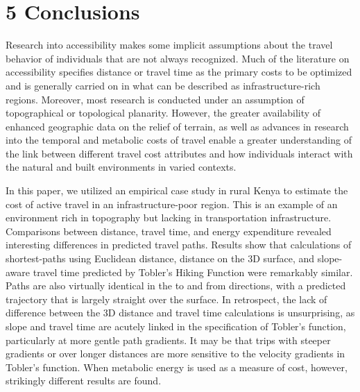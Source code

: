 \documentclass[]{elsarticle} %
\begin{document}
\hypertarget{conclusions}{%
\section{5 Conclusions}\label{conclusions}}

Research into accessibility makes some implicit assumptions about the
travel behavior of individuals that are not always recognized. Much of
the literature on accessibility specifies distance or travel time as the
primary costs to be optimized and is generally carried on in what can be
described as infrastructure-rich regions. Moreover, most research is
conducted under an assumption of topographical or topological planarity.
However, the greater availability of enhanced geographic data on the
relief of terrain, as well as advances in research into the temporal and
metabolic costs of travel enable a greater understanding of the link
between different travel cost attributes and how individuals interact
with the natural and built environments in varied contexts.

In this paper, we utilized an empirical case study in rural Kenya to
estimate the cost of active travel in an infrastructure-poor region.
This is an example of an environment rich in topography but lacking in
transportation infrastructure. Comparisons between distance, travel
time, and energy expenditure revealed interesting differences in
predicted travel paths. Results show that calculations of shortest-paths
using Euclidean distance, distance on the 3D surface, and slope-aware
travel time predicted by Tobler's Hiking Function were remarkably
similar. Paths are also virtually identical in the to and from
directions, with a predicted trajectory that is largely straight over
the surface. In retrospect, the lack of difference between the 3D
distance and travel time calculations is unsurprising, as slope and
travel time are acutely linked in the specification of Tobler's
function, particularly at more gentle path gradients. It may be that
trips with steeper gradients or over longer distances are more sensitive
to the velocity gradients in Tobler's function. When metabolic energy is
used as a measure of cost, however, strikingly different results are
found.
\end{document}
